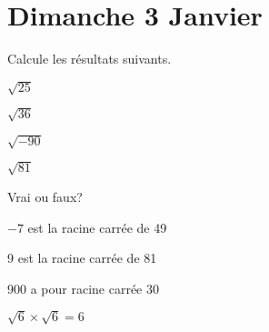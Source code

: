 \section{Dimanche 3 Janvier}

\begin{exercice}
    Calcule les résultats suivants.
    \begin{exerciceenum}
        \item $\sqrt{25}$
        \item $\sqrt{36}$
        \item $\sqrt{-90}$
        \item $\sqrt{81}$
    \end{exerciceenum}
\end{exercice}

\begin{exercice}
    Vrai ou faux?
    \begin{exerciceenumnoeq}
        \item $-7$ est la racine carrée de 49
        \item 9 est la racine carrée de 81
        \item 900 a pour racine carrée 30
        \item $\sqrt{6} \times \sqrt{6} = 6$
    \end{exerciceenumnoeq}
\end{exercice}